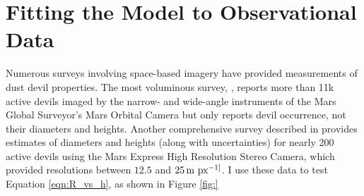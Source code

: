 \documentclass{aastex63}
\begin{document}
\section{Fitting the Model to Observational Data}
Numerous surveys involving space-based imagery have provided measurements of dust devil properties. The most voluminous survey, \citet{2006JGRE..11112002C}, reports more than 11k active devils imaged by the narrow- and wide-angle instruments of the Mars Global Surveyor's Mars Orbital Camera but only reports devil occurrence, not their diameters and heights. Another comprehensive survey described in \citet{2008Icar..197...39S} provides estimates of diameters and heights (along with uncertainties) for nearly 200 active devils using the Mars Express High Resolution Stereo Camera, which provided resolutions between $12.5$ and $25\,{\rm m\ px^{-1]}}$. I use these data to test Equation \ref{eqn:R_vs_h}, as shown in Figure \ref{fig:}







\end{document}

